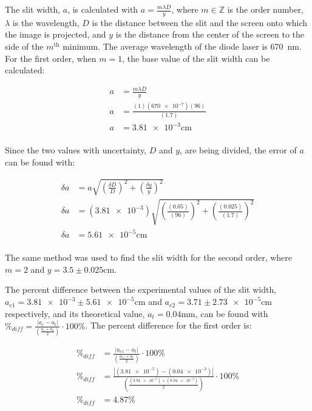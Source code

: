\documentclass[12pt]{article}
\begin{document}
\qq The slit width, \(a\), is calculated with \(a = \frac{m \lambda D}{y}\),
where \(m \in \mathbb{Z}\) is the order number, \(\lambda\) is the wavelength, \(D\) is the
distance between the slit and the screen onto which the image is projected, and
\(y\) is the distance from the center of the screen to the side of the
\(m^{\text{th}}\) minimum. The average wavelength of the diode laser is
\SI{670}{\nano\meter}. For the first order, when \(m = 1\), the base value of
the slit width can be calculated:

\begin{align*}
  a &= \frac{m \lambda D}{y} \\
  a &= \frac{(1) (\num{670e-7}) (96)}{(1.7)} \\
  a &= \num{3.81e-3} \si{\centi\meter} \\
\end{align*}

Since the two values with uncertainty, \(D\) and \(y\), are being divided, the
error of \(a\) can be found with:

\begin{align*}
  \delta a &= a \sqrt{\left( \frac{\delta D}{D} \right) ^2 + \left( \frac{\delta
             y}{y} \right) ^2 } \\
  \delta a &= (\num{3.81e-3}) \sqrt{\left( \frac{(0.05)}{(96)} \right) ^2 +
             \left( \frac{(0.025)}{(1.7)} \right) ^2} \\
  \delta a &= \num{5.61e-5}\si{\centi\meter} \\
\end{align*}

The same method was used to find the slit width for the second order, where \(m
= 2\) and \(y = 3.5 \pm \num{0.025} \si{\centi\meter}\).

\qq The percent difference between the experimental values of the slit width,
\(a_{e1} = \num{3.81e-3} \pm \num{5.61e-5} \si{\centi\meter}\) and
\(a_{e2} = \num{3.71} \pm \num{2.73e-5} \si{\centi\meter}\) respectively, and
its theoretical value, \(a_t = \num{0.04} \si{\milli\meter}\), can be found with
\\\( \%_{diff} = \frac{\left| a_e - a_t \right|}{\left( \frac{a_e + a_t}{2} \right)} \cdot
100\% \). The percent difference for the first order is:

\begin{align*}
  \%_{diff} &= \frac{\left| a_{e1} - a_t \right|}{\left( \frac{a_{e1} + a_t}{2} 
              \right)} \cdot 100\% \\
  \%_{diff} &= \frac{\left| (\num{3.81e-5}) - (\num{0.04e-3}) \right|}{\left(
              \frac{(\num{3.81e-5}) + (\num{0.04e-3})}{2} \right)} \cdot 100\%
  \\
  \%_{diff} &= 4.87\% \\
\end{align*}
\end{document}
